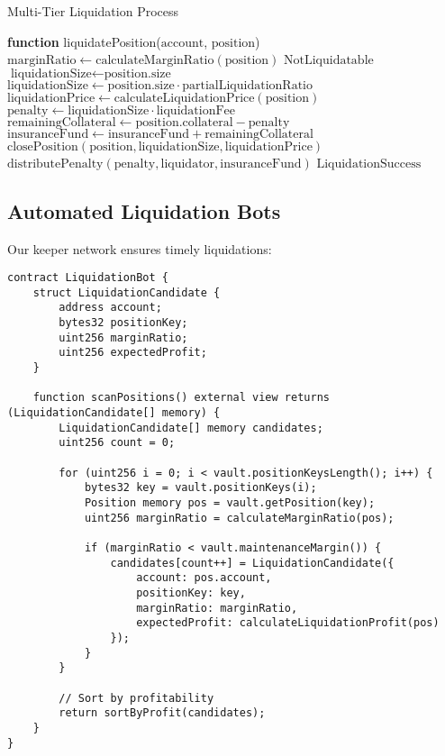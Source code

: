 \documentclass[11pt,a4paper]{article}
\begin{document}
\begin{algorithm}
\caption{Multi-Tier Liquidation Process}
\begin{algorithmic}[1]
\STATE \textbf{function} liquidatePosition($\text{account}$, $\text{position}$)
\STATE $\text{marginRatio} \gets \text{calculateMarginRatio}(\text{position})$
    \RETURN $\text{NotLiquidatable}$
\ENDIF
\STATE $\text{liquidationSize} \gets \text{position.size}$
    \STATE $\text{liquidationSize} \gets \text{position.size} \cdot \text{partialLiquidationRatio}$
\ENDIF
\STATE $\text{liquidationPrice} \gets \text{calculateLiquidationPrice}(\text{position})$
\STATE $\text{penalty} \gets \text{liquidationSize} \cdot \text{liquidationFee}$
\STATE $\text{remainingCollateral} \gets \text{position.collateral} - \text{penalty}$
    \STATE $\text{insuranceFund} \gets \text{insuranceFund} + \text{remainingCollateral}$
\ENDIF
\STATE $\text{closePosition}(\text{position}, \text{liquidationSize}, \text{liquidationPrice})$
\STATE $\text{distributePenalty}(\text{penalty}, \text{liquidator}, \text{insuranceFund})$
\RETURN $\text{LiquidationSuccess}$
\end{algorithmic}
\end{algorithm}

\subsection{Automated Liquidation Bots}

Our keeper network ensures timely liquidations:

\begin{lstlisting}[caption={Liquidation Bot Implementation}]
contract LiquidationBot {
    struct LiquidationCandidate {
        address account;
        bytes32 positionKey;
        uint256 marginRatio;
        uint256 expectedProfit;
    }

    function scanPositions() external view returns (LiquidationCandidate[] memory) {
        LiquidationCandidate[] memory candidates;
        uint256 count = 0;

        for (uint256 i = 0; i < vault.positionKeysLength(); i++) {
            bytes32 key = vault.positionKeys(i);
            Position memory pos = vault.getPosition(key);
            uint256 marginRatio = calculateMarginRatio(pos);

            if (marginRatio < vault.maintenanceMargin()) {
                candidates[count++] = LiquidationCandidate({
                    account: pos.account,
                    positionKey: key,
                    marginRatio: marginRatio,
                    expectedProfit: calculateLiquidationProfit(pos)
                });
            }
        }

        // Sort by profitability
        return sortByProfit(candidates);
    }
}
\end{lstlisting}
\end{document}
